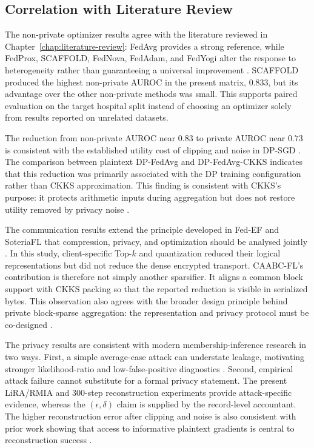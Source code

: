 \subsection{Correlation with Literature Review}
\label{subsec:correlation-literature}

The non-private optimizer results agree with the literature reviewed in Chapter~\ref{chap:literature-review}: FedAvg provides a strong reference, while FedProx, SCAFFOLD, FedNova, FedAdam, and FedYogi alter the response to heterogeneity rather than guaranteeing a universal improvement \cite{mcmahan2017fedavg,li2020fedprox,karimireddy2020scaffold,wang2020fednova,reddi2021adaptive}. SCAFFOLD produced the highest non-private AUROC in the present matrix, $0.833$, but its advantage over the other non-private methods was small. This supports paired evaluation on the target hospital split instead of choosing an optimizer solely from results reported on unrelated datasets.

The reduction from non-private AUROC near $0.83$ to private AUROC near $0.73$ is consistent with the established utility cost of clipping and noise in DP-SGD \cite{abadi2016deep}. The comparison between plaintext DP-FedAvg and DP-FedAvg-CKKS indicates that this reduction was primarily associated with the DP training configuration rather than CKKS approximation. This finding is consistent with CKKS's purpose: it protects arithmetic inputs during aggregation but does not restore utility removed by privacy noise \cite{cheon2017homomorphic}.

The communication results extend the principle developed in Fed-EF and SoteriaFL that compression, privacy, and optimization should be analysed jointly \cite{li2023fedef,li2022soteriafl}. In this study, client-specific Top-$k$ and quantization reduced their logical representations but did not reduce the dense encrypted transport. CAABC-FL's contribution is therefore not simply another sparsifier. It aligns a common block support with CKKS packing so that the reported reduction is visible in serialized bytes. This observation also agrees with the broader design principle behind private block-sparse aggregation: the representation and privacy protocol must be co-designed \cite{asi2025preamble}.

The privacy results are consistent with modern membership-inference research in two ways. First, a simple average-case attack can understate leakage, motivating stronger likelihood-ratio and low-false-positive diagnostics \cite{carlini2022membership}. Second, empirical attack failure cannot substitute for a formal privacy statement. The present LiRA/RMIA and 300-step reconstruction experiments provide attack-specific evidence, whereas the $(\epsilon,\delta)$ claim is supplied by the record-level accountant. The higher reconstruction error after clipping and noise is also consistent with prior work showing that access to informative plaintext gradients is central to reconstruction success \cite{zhu2019dlg,geiping2020inverting}.

